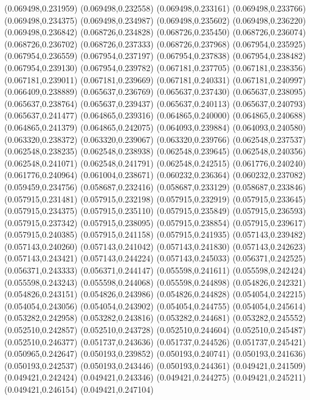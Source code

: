 (0.069498,0.231959)
(0.069498,0.232558)
(0.069498,0.233161)
(0.069498,0.233766)
(0.069498,0.234375)
(0.069498,0.234987)
(0.069498,0.235602)
(0.069498,0.236220)
(0.069498,0.236842)
(0.068726,0.234828)
(0.068726,0.235450)
(0.068726,0.236074)
(0.068726,0.236702)
(0.068726,0.237333)
(0.068726,0.237968)
(0.067954,0.235925)
(0.067954,0.236559)
(0.067954,0.237197)
(0.067954,0.237838)
(0.067954,0.238482)
(0.067954,0.239130)
(0.067954,0.239782)
(0.067181,0.237705)
(0.067181,0.238356)
(0.067181,0.239011)
(0.067181,0.239669)
(0.067181,0.240331)
(0.067181,0.240997)
(0.066409,0.238889)
(0.065637,0.236769)
(0.065637,0.237430)
(0.065637,0.238095)
(0.065637,0.238764)
(0.065637,0.239437)
(0.065637,0.240113)
(0.065637,0.240793)
(0.065637,0.241477)
(0.064865,0.239316)
(0.064865,0.240000)
(0.064865,0.240688)
(0.064865,0.241379)
(0.064865,0.242075)
(0.064093,0.239884)
(0.064093,0.240580)
(0.063320,0.238372)
(0.063320,0.239067)
(0.063320,0.239766)
(0.062548,0.237537)
(0.062548,0.238235)
(0.062548,0.238938)
(0.062548,0.239645)
(0.062548,0.240356)
(0.062548,0.241071)
(0.062548,0.241791)
(0.062548,0.242515)
(0.061776,0.240240)
(0.061776,0.240964)
(0.061004,0.238671)
(0.060232,0.236364)
(0.060232,0.237082)
(0.059459,0.234756)
(0.058687,0.232416)
(0.058687,0.233129)
(0.058687,0.233846)
(0.057915,0.231481)
(0.057915,0.232198)
(0.057915,0.232919)
(0.057915,0.233645)
(0.057915,0.234375)
(0.057915,0.235110)
(0.057915,0.235849)
(0.057915,0.236593)
(0.057915,0.237342)
(0.057915,0.238095)
(0.057915,0.238854)
(0.057915,0.239617)
(0.057915,0.240385)
(0.057915,0.241158)
(0.057915,0.241935)
(0.057143,0.239482)
(0.057143,0.240260)
(0.057143,0.241042)
(0.057143,0.241830)
(0.057143,0.242623)
(0.057143,0.243421)
(0.057143,0.244224)
(0.057143,0.245033)
(0.056371,0.242525)
(0.056371,0.243333)
(0.056371,0.244147)
(0.055598,0.241611)
(0.055598,0.242424)
(0.055598,0.243243)
(0.055598,0.244068)
(0.055598,0.244898)
(0.054826,0.242321)
(0.054826,0.243151)
(0.054826,0.243986)
(0.054826,0.244828)
(0.054054,0.242215)
(0.054054,0.243056)
(0.054054,0.243902)
(0.054054,0.244755)
(0.054054,0.245614)
(0.053282,0.242958)
(0.053282,0.243816)
(0.053282,0.244681)
(0.053282,0.245552)
(0.052510,0.242857)
(0.052510,0.243728)
(0.052510,0.244604)
(0.052510,0.245487)
(0.052510,0.246377)
(0.051737,0.243636)
(0.051737,0.244526)
(0.051737,0.245421)
(0.050965,0.242647)
(0.050193,0.239852)
(0.050193,0.240741)
(0.050193,0.241636)
(0.050193,0.242537)
(0.050193,0.243446)
(0.050193,0.244361)
(0.049421,0.241509)
(0.049421,0.242424)
(0.049421,0.243346)
(0.049421,0.244275)
(0.049421,0.245211)
(0.049421,0.246154)
(0.049421,0.247104)
